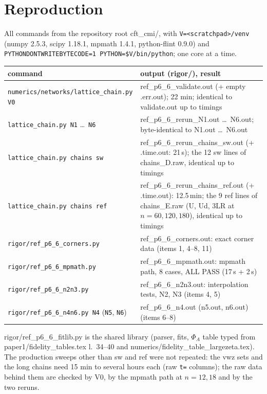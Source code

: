 \documentclass[11pt]{article}
\begin{document}
\section{Reproduction}\label{sec:repro}
All commands from the repository root cft\_cmi/, with
\texttt{V=<scratchpad>/venv} (numpy 2.5.3, scipy 1.18.1, mpmath 1.4.1, python-flint 0.9.0) and
\texttt{PYTHONDONTWRITEBYTECODE=1 PYTHON=\$V/bin/python}; one core at a time.
\begin{center}\small
\begin{tabular}{p{}p{}}
\toprule
command & output (rigor/), result\\
\midrule
\texttt{numerics/networks/lattice\_chain.py V0} & ref\_p6\_6\_validate.out (+ empty .err.out); 22 min; identical to validate.out up to timings\\
\texttt{lattice\_chain.py N1} \ldots\ \texttt{N6} & ref\_p6\_6\_rerun\_N1.out \ldots\ N6.out; byte-identical to N1.out \ldots\ N6.out\\
\texttt{lattice\_chain.py chains sw} & ref\_p6\_6\_rerun\_chains\_sw.out (+ .time.out: 21\,s); the 12 sw lines of chains\_D.raw, identical up to timings\\
\texttt{lattice\_chain.py chains ref} & ref\_p6\_6\_rerun\_chains\_ref.out (+ .time.out): 12.5\,min; the 9 ref lines of chains\_E.raw (U, Ud, 3LR at $n=60,120,180$), identical up to timings\\
\texttt{rigor/ref\_p6\_6\_corners.py} & ref\_p6\_6\_corners.out: exact corner data (items 1, 4--8, 11)\\
\texttt{rigor/ref\_p6\_6\_mpmath.py} & ref\_p6\_6\_mpmath.out: mpmath path, 8 cases, ALL PASS (17\,s + 2\,s)\\
\texttt{rigor/ref\_p6\_6\_n2n3.py} & ref\_p6\_6\_n2n3.out: interpolation tests, N2, N3 (items 4, 5)\\
\texttt{rigor/ref\_p6\_6\_n4n6.py N4} (\texttt{N5}, \texttt{N6}) & ref\_p6\_6\_n4.out (n5.out, n6.out) (items 6--8)\\
\bottomrule
\end{tabular}
\end{center}
rigor/ref\_p6\_6\_fitlib.py is the shared library (parser, fits, $\Phi_A$ table typed from paper1/fidelity\_tables.tex
l.~34--40 and numerics/fidelity\_table\_largezeta.tex). The production sweeps other than sw and ref were not
repeated: the vwz sets and the long chains need 15 min to several hours each (raw \texttt{t=} columns); the raw data
behind them are checked by V0, by the mpmath path at $n=12,18$ and by the two reruns.
\end{document}
